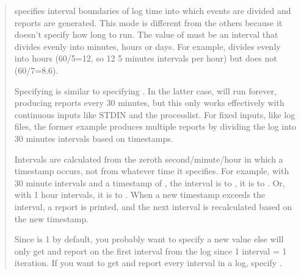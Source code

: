 \documentclass[letterpaper,10pt,english]{sphinxmanual}
\begin{document}
\begin{fulllineitems}
\begin{quote}
{\hyperref[\detokenize{mariadb-query-digest:cmdoption-mariadb-query-digest-run-time}]{}} specifies interval boundaries of log time into which events
are divided and reports are generated.  This mode is different from the
others because it doesn’t specify how long to run.  The value of
{\hyperref[\detokenize{mariadb-query-digest:cmdoption-mariadb-query-digest-run-time}]{}} must be an interval that divides evenly into minutes, hours
or days.  For example,  divides evenly into hours (60/5=12, so 12
5 minutes intervals per hour) but  does not (60/7=8.6).

Specifying  is
similar to specifying .
In the latter case,  will run forever, producing reports every
30 minutes, but this only works effectively with  continuous inputs like
STDIN and the processlist.  For fixed inputs, like log files, the former
example produces multiple reports by dividing the log into 30 minutes
intervals based on timestamps.

Intervals are calculated from the zeroth second/minute/hour in which a
timestamp occurs, not from whatever time it specifies.  For example,
with 30 minute intervals and a timestamp of , the interval
is   to , it is  to .
Or, with 1 hour intervals, it is  to .
When a new timestamp exceeds the interval, a report is printed, and the
next interval is recalculated based on the new timestamp.

Since {\hyperref[\detokenize{mariadb-query-digest:cmdoption-mariadb-query-digest-iterations}]{}} is 1 by default, you probably want to specify
a new value else  will only get and report on the first
interval from the log since 1 interval = 1 iteration.  If you want to
get and report every interval in a log, specify {\hyperref[\detokenize{mariadb-query-digest:cmdoption-mariadb-query-digest-iterations}]{}} .
\end{quote}

\end{fulllineitems}
\end{document}
